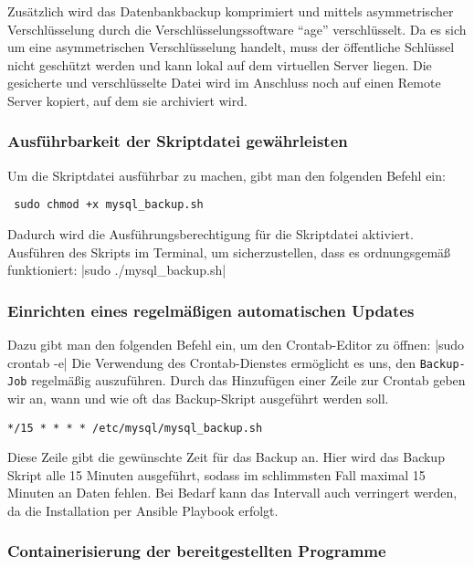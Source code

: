 Zusätzlich wird das Datenbankbackup komprimiert und mittels asymmetrischer Verschlüsselung durch die Verschlüsselungssoftware \enquote{age} verschlüsselt. Da es sich um eine asymmetrischen Verschlüsselung handelt, muss der öffentliche Schlüssel nicht geschützt werden und kann lokal auf dem virtuellen Server liegen. Die gesicherte und verschlüsselte Datei wird im Anschluss noch auf einen Remote Server kopiert, auf dem sie archiviert wird.

\subsubsection*{Ausführbarkeit der Skriptdatei gewährleisten}

Um die Skriptdatei ausführbar zu machen, gibt man den folgenden Befehl ein:
\begin{verbatim} sudo chmod +x mysql_backup.sh \end{verbatim}
Dadurch wird die Ausführungsberechtigung für die Skriptdatei aktiviert.
Ausführen des Skripts im Terminal, um sicherzustellen, dass es ordnungsgemäß funktioniert:
|sudo ./mysql_backup.sh|

\subsubsection*{Einrichten eines regelmäßigen automatischen Updates}

Dazu gibt man den folgenden Befehl ein, um den Crontab-Editor zu öffnen:
|sudo crontab -e|
Die Verwendung des Crontab-Dienstes ermöglicht es uns, den \verb+Backup-Job+ regelmäßig auszuführen. Durch das Hinzufügen einer Zeile zur Crontab geben wir an, wann und wie oft das Backup-Skript ausgeführt werden soll. 

\begin{verbatim}*/15 * * * * /etc/mysql/mysql_backup.sh\end{verbatim}

Diese Zeile gibt die gewünschte Zeit für das Backup an. Hier wird das Backup Skript alle 15 Minuten ausgeführt, sodass im schlimmsten Fall maximal 15 Minuten an Daten fehlen. Bei Bedarf kann das Intervall auch verringert werden, da die Installation per Ansible Playbook erfolgt.

\subsubsection{Containerisierung der bereitgestellten Programme}

